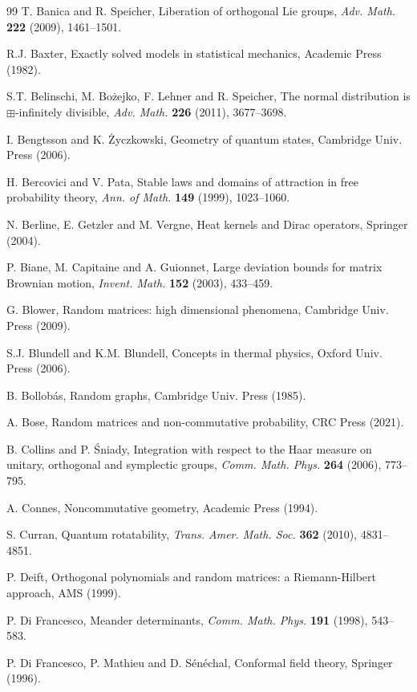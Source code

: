 \documentclass[12pt]{amsbook}
\begin{document}
\begin{thebibliography}{99}
T. Banica and R. Speicher, Liberation of orthogonal Lie groups, {\em Adv. Math.} {\bf 222} (2009), 1461--1501.

R.J. Baxter, Exactly solved models in statistical mechanics, Academic Press (1982).

S.T. Belinschi, M. Bo\.zejko, F. Lehner and R. Speicher, The normal distribution is $\boxplus$-infinitely divisible, {\em Adv. Math.} {\bf 226} (2011), 3677--3698.

I. Bengtsson and K. \.Zyczkowski, Geometry of quantum states, Cambridge Univ. Press (2006).

H. Bercovici and V. Pata, Stable laws and domains of attraction in free probability theory, {\em Ann. of Math.} {\bf 149} (1999), 1023--1060.

N. Berline, E. Getzler and M. Vergne, Heat kernels and Dirac operators, Springer (2004).

P. Biane, M. Capitaine and A. Guionnet, Large deviation bounds for matrix Brownian motion, {\em Invent. Math.} {\bf 152} (2003), 433--459.

G. Blower, Random matrices: high dimensional phenomena, Cambridge Univ. Press (2009).

S.J. Blundell and K.M. Blundell, Concepts in thermal physics, Oxford Univ. Press (2006).

B. Bollob\'as, Random graphs, Cambridge Univ. Press (1985).

A. Bose, Random matrices and non-commutative probability, CRC Press (2021).

B. Collins and P. \'Sniady, Integration with respect to the Haar measure on unitary, orthogonal and symplectic groups, {\em Comm. Math. Phys.} {\bf 264} (2006), 773--795.

A. Connes, Noncommutative geometry, Academic Press (1994).

S. Curran, Quantum rotatability, {\em Trans. Amer. Math. Soc.} {\bf 362} (2010), 4831--4851.

P. Deift, Orthogonal polynomials and random matrices: a Riemann-Hilbert approach, AMS (1999).

P. Di Francesco, Meander determinants, {\em Comm. Math. Phys.} {\bf 191} (1998), 543--583.

P. Di Francesco, P. Mathieu and D. S\'en\'echal, Conformal field theory, Springer (1996).


\end{thebibliography}
\end{document}
